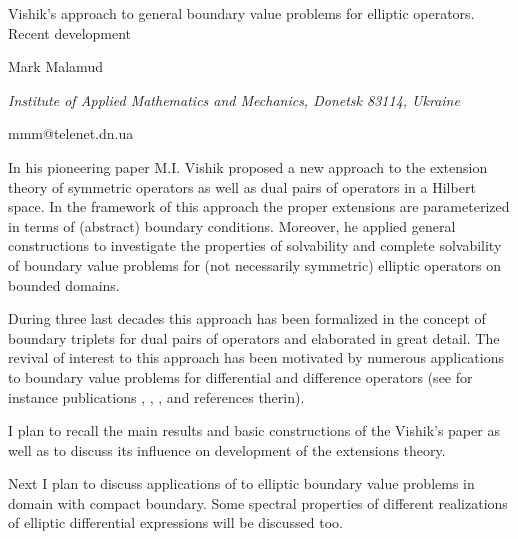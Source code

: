 \documentclass[10pt,a4paper]{article}
\begin{document}
\begin{center}

{\Large Vishik's approach to general boundary value problems for elliptic operators. Recent development}

\bigskip

{\sc Mark Malamud}

{\small\it Institute of Applied Mathematics and Mechanics, Donetsk 83114, Ukraine}

{\small\rm mmm@telenet.dn.ua}

\end{center}

\bigskip




In his pioneering paper \cite{Vis52} M.I. Vishik proposed a new
approach to the extension theory of symmetric operators as well as
dual pairs of operators in a Hilbert space. In the framework of
this approach the proper extensions are parameterized in terms of
(abstract) boundary conditions. Moreover, he applied
general constructions to investigate  %
the properties of solvability and complete solvability  of
boundary value problems for (not necessarily symmetric) elliptic
operators on bounded domains.


During three last decades this approach has been formalized in the
concept of boundary triplets for dual pairs of operators and 
elaborated in great detail.  The revival of interest to this
approach  has been motivated by numerous applications to boundary
value problems for differential and difference operators (see for
instance publications \cite{Grubb68}, \cite{BroGruWoo09},
\cite{KosMal10}, \cite{Mal10} and references therin).


I plan to recall the main results and basic constructions of the
Vishik's paper  \cite{Vis52} as well as  to discuss  its influence
on development of the extensions theory.

Next I plan to discuss  applications of to elliptic boundary value
problems in domain with compact boundary. Some spectral properties
of different realizations of elliptic differential expressions
will be discussed too.
\end{document}
